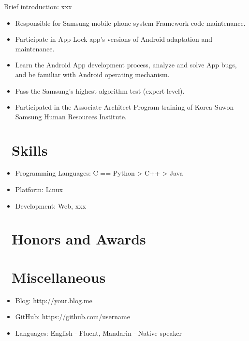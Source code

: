\documentclass{resume}
\begin{document}
Brief introduction: xxx
\begin{itemize}
  \item Responsible for Samsung mobile phone system Framework code maintenance.
  \item Participate in App Lock app's versions of Android adaptation and maintenance.
  \item Learn the Android App development process, analyze and solve App bugs, and be familiar with Android operating mechanism.
  \item Pass the Samsung's highest algorithm test (expert level).
  \item Participated in the Associate Architect Program training of Korea Suwon Samsung Human Resources Institute.
\end{itemize}


\section{\faCogs\ Skills}
\begin{itemize}[parsep=0.5ex]
  \item Programming Languages: C == Python > C++ > Java
  \item Platform: Linux
  \item Development: Web, xxx
\end{itemize}

\section{\faHeartO\ Honors and Awards}

\section{\faInfo\ Miscellaneous}
\begin{itemize}[parsep=0.5ex]
  \item Blog: http://your.blog.me
  \item GitHub: https://github.com/username
  \item Languages: English - Fluent, Mandarin - Native speaker
\end{itemize}

%
%
\end{document}
